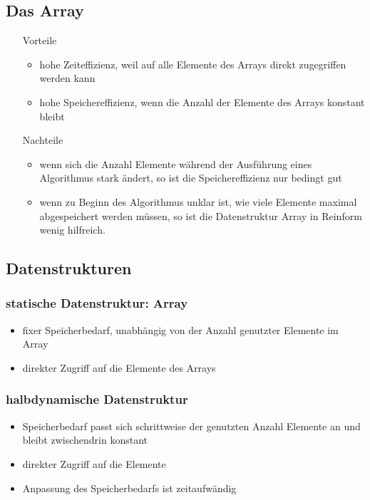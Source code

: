 \documentclass[a4paper,10pt]{article}
\begin{document}
\subsection{Das Array}

\begin{itemize}
	\item[Vorteile] 
		\begin{itemize}
			\item hohe Zeiteffizienz, weil auf alle Elemente des Arrays direkt zugegriffen werden kann
			\item hohe Speichereffizienz, wenn die Anzahl der Elemente des Arrays konstant bleibt
		\end{itemize}
	\item[Nachteile] 
		\begin{itemize}
			\item wenn sich die Anzahl Elemente während der Ausführung eines Algorithmus stark ändert, so ist die Speichereffizienz nur bedingt gut
			\item wenn zu Beginn des Algorithmus unklar ist, wie viele Elemente maximal abgespeichert werden müssen, so ist die Datenstruktur Array in Reinform wenig hilfreich.
		\end{itemize}
\end{itemize}

\subsection{Datenstrukturen}

\subsubsection{statische Datenstruktur: Array}
\begin{itemize}
	\item fixer Speicherbedarf, unabhängig von der Anzahl genutzter Elemente im Array
	\item direkter Zugriff auf die Elemente des Arrays
\end{itemize}

\subsubsection{halbdynamische Datenstruktur}
\begin{itemize}
	\item Speicherbedarf passt sich schrittweise der genutzten Anzahl Elemente an und bleibt zwischendrin konstant
	\item direkter Zugriff auf die Elemente
	\item Anpassung des Speicherbedarfs ist zeitaufwändig
\end{itemize}
\end{document}

